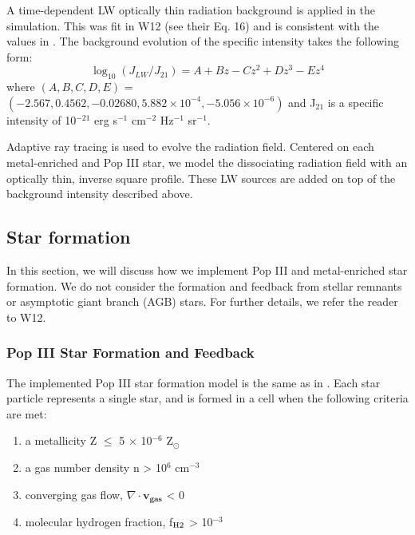 \documentclass[a4paper,fleqn,usenatbib]{mnras}
\begin{document}
A time-dependent LW optically thin radiation background is applied in the simulation. This was fit in W12 (see their Eq. 16) and is consistent with the values in \citet{Trenti09_SFR}. The background evolution of the specific intensity takes the following form:
\begin{equation} \label{LWbg}
	\log_{10}(J_{LW}/J_{21}) = A + Bz - Cz^{2} + Dz^{3} - Ez^{4}
\end{equation}
where $(A, B, C, D, E)$ = $(-2.567, 0.4562, - 0.02680, 5.882 \times 10^{-4}, - 5.056 \times 10^{-6})$ and J$_{21}$ is a specific intensity of 10$^{-21}$ erg s$^{-1}$ cm$^{-2}$ Hz$^{-1}$ sr$^{-1}$. 

Adaptive ray tracing \citep{Abel02_RT, Wise11_Moray} is used to evolve the radiation field. Centered on each metal-enriched and Pop III star, we model the \hh{} dissociating radiation field with an optically thin, inverse square profile. These LW sources are added on top of the background intensity described above.
\subsection{Star formation}
In this section, we will discuss how we implement Pop III and metal-enriched star formation. We do not consider the formation and feedback from stellar remnants or asymptotic giant branch (AGB) stars. For further details, we refer the reader to W12. 

\subsubsection{Pop III Star Formation and Feedback }
The implemented Pop III star formation model is the same as in \citet{Wise08_Gal}. Each star particle represents a single star, and is formed in a cell when the following criteria are met: 
\begin{enumerate}
	\item a metallicity Z $\leq$ 5 $\times$ 10$^{-6}$ Z$_{\odot}$

	\item a gas number density n > 10$^{6}$ cm$^{-3}$

	\item converging gas flow, $\nabla \cdot \mathbf{v_{gas}}$ < 0 

	\item molecular hydrogen fraction, f$_{\rm H2}$ > 10$^{-3}$
\end{enumerate}
\end{document}
